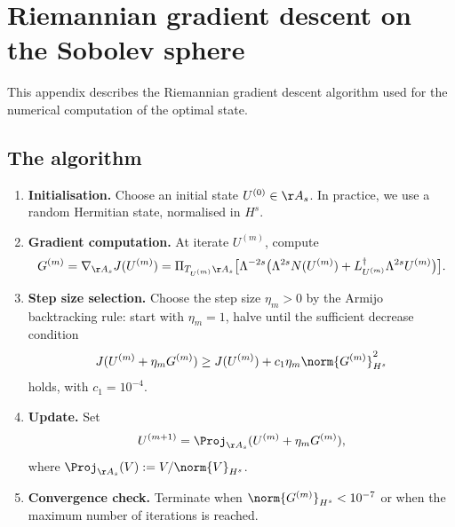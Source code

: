 \section{Riemannian gradient descent on the Sobolev sphere}
\label{app:C}

This appendix describes the Riemannian gradient descent algorithm 
used for the numerical computation of the optimal state.

\subsection{The algorithm}
\label{ssec:C-alg}

\begin{enumerate}[label=(\arabic*),leftmargin=*]
\item \textbf{Initialisation.} Choose an initial state 
      $U^{(0)}\in\AA_s$. In practice, we use a random Hermitian 
      state, normalised in $H^s$.

\item \textbf{Gradient computation.} At iterate $U^{(m)}$, compute
      \begin{equation}\label{eq:C-grad}
      G^{(m)} = \nabla_{\AA_s}J(U^{(m)}) = 
      \Pi_{T_{U^{(m)}}\AA_s}\bigl[\Lambda^{-2s}
      \bigl(\Lambda^{2s}N(U^{(m)}) + L_{U^{(m)}}^\dagger
      \Lambda^{2s}U^{(m)}\bigr)\bigr].
      \end{equation}

\item \textbf{Step size selection.} Choose the step size $\eta_m>0$ 
      by the Armijo backtracking rule: start with $\eta_m=1$, halve 
      until the sufficient decrease condition
      \begin{equation}\label{eq:armijo}
      J(U^{(m)}+\eta_m G^{(m)}) \geq J(U^{(m)}) + 
      c_1\eta_m\norm{G^{(m)}}_{H^s}^2
      \end{equation}
      holds, with $c_1=10^{-4}$.

\item \textbf{Update.} Set
      \begin{equation}\label{eq:C-update}
      U^{(m+1)} = \Proj_{\AA_s}(U^{(m)} + \eta_m G^{(m)}),
      \end{equation}
      where $\Proj_{\AA_s}(V) := V/\norm{V}_{H^s}$.

\item \textbf{Convergence check.} Terminate when 
      $\norm{G^{(m)}}_{H^s}<10^{-7}$ or when the maximum number of 
      iterations is reached.
\end{enumerate}

